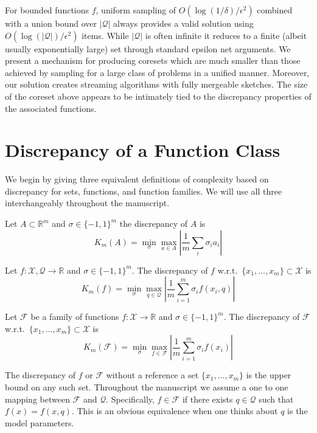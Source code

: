 \documentclass[anon,12pt]{colt2019} %
\newcommand{\R}{\mathbb{R}}
\newcommand{\eps}{\epsilon}
\newcommand{\F}{\mathcal{F}}
\newcommand{\X}{\mathcal{X}}
\newcommand{\Q}{\mathcal{Q}}
\begin{document}
For bounded functions $f$, uniform sampling of $O(\log(1/\delta)/\eps^2)$ combined with a union bound over $|\mathcal Q|$ always provides a valid solution using $O(\log(|\mathcal Q|)/\eps^2)$ items. 
While $|\mathcal Q|$ is often infinite it reduces to a finite (albeit usually exponentially large) set through standard epsilon net arguments. 
%
We present a mechanism for producing coresets which are much smaller than those achieved by sampling for a large class of problems in a unified manner. 
Moreover, our solution creates streaming algorithms with fully mergeable sketches. 
The size of the coreset above appears to be intimately tied to the discrepancy properties of the associated functions.


\section{Discrepancy of a Function Class}
We begin by giving three equivalent definitions of complexity based on discrepancy for sets, functions, and function families. We will use all three interchangeably throughout the manuscript.
\begin{definition}
Let $A \subset \R^m$ and $\sigma \in \{-1,1\}^m$ the discrepancy of $A$ is 
\[
K_m(A)  = \min_\sigma \max_{a\in A} \left| \frac{1}{m} \sum_i  \sigma_i  a_i\right| 
\]
\end{definition}
%
\begin{definition}
Let $f:\X,\Q\rightarrow\R$ and $\sigma \in \{-1,1\}^m$. 
The discrepancy of $f$ w.r.t.\ $\{x_1,\ldots,x_m\} \subset \X$ is 
\[
K_m(f) =  \min_{\sigma} \max_{q \in \Q}  \left|\frac{1}{m} \sum_{i=1}^{m}\sigma_i f(x_i,q)\right|
\]
\end{definition}
%
\begin{definition}
Let $\F$ be a family of functions $f:\X\rightarrow\R$ and $\sigma \in \{-1,1\}^m$. 
The discrepancy of $\F$ w.r.t.\ $\{x_1,\ldots,x_m\} \subset \X$ is 
\[
K_m(\F) =  \min_{\sigma} \max_{f \in \F}  \left| \frac{1}{m} \sum_{i=1}^{m}\sigma_i f(x_i)\right|
\]
\end{definition}
The discrepancy of $f$ or $\F$ without a reference a set $\{x_1,\ldots,x_m\}$ is the upper bound on any such set.
Throughout the manuscript we assume a one to one mapping between $\F$ and $\Q$. 
Specifically, $f \in \F$ if there exists $q \in \Q$ such that $f(x) = f(x,q)$. This is an obvious equivalence when one thinks about $q$ is the model parameters. 
\end{document}
